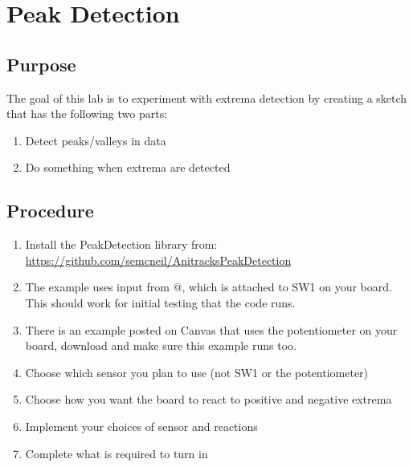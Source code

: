 \chapter{Peak Detection}

\section{Purpose}
The goal of this lab is to experiment with extrema detection by creating a sketch
that has the following two parts:
\begin{enumerate}
    \item Detect peaks/valleys in data 
    \item Do something when extrema are detected
\end{enumerate}



\section{Procedure}

\begin{enumerate}
    \item Install the PeakDetection library from:\\
          \href{https://github.com/semcneil/AnitracksPeakDetection}{https://github.com/semcneil/AnitracksPeakDetection}
    \item The example uses input from @, which is attached to SW1 on your board. 
            This should work for initial testing that the code runs.
    \item There is an example posted on Canvas that uses the potentiometer on your board, download
            and make sure this example runs too.
    \item Choose which sensor you plan to use (not SW1 or the potentiometer)
    \item Choose how you want the board to react to positive and negative extrema 
    \item Implement your choices of sensor and reactions
    \item Complete what is required to turn in
\end{enumerate}

